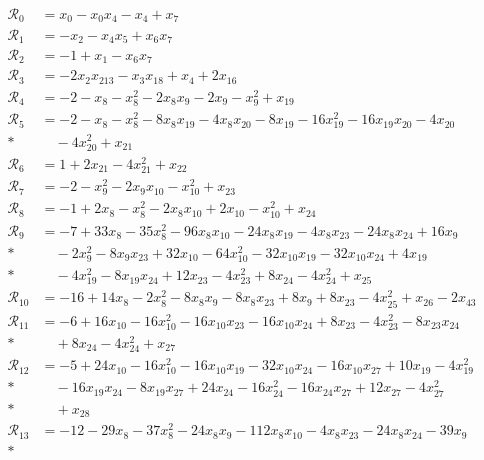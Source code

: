 \begingroup
\fontsize{8.6}{10.4}\selectfont
\setlength{\jot}{3pt}
\allowdisplaybreaks[4]
\begin{align*}
\mathcal R_{0} &= x_{0} -x_{0}x_{4} -x_{4} +x_{7} \\
\mathcal R_{1} &= -x_{2} -x_{4}x_{5} +x_{6}x_{7} \\
\mathcal R_{2} &= -1 +x_{1} -x_{6}x_{7} \\
\mathcal R_{3} &= -2x_{2}x_{213} -x_{3}x_{18} +x_{4} +2x_{16} \\
\mathcal R_{4} &= -2 -x_{8} -x_{8}^{2} -2x_{8}x_{9} -2x_{9} -x_{9}^{2} +x_{19} \\
\mathcal R_{5} &= -2 -x_{8} -x_{8}^{2} -8x_{8}x_{19} -4x_{8}x_{20} -8x_{19} -16x_{19}^{2} -16x_{19}x_{20} -4x_{20} \\*
&\quad -4x_{20}^{2} +x_{21} \\
\mathcal R_{6} &= 1 +2x_{21} -4x_{21}^{2} +x_{22} \\
\mathcal R_{7} &= -2 -x_{9}^{2} -2x_{9}x_{10} -x_{10}^{2} +x_{23} \\
\mathcal R_{8} &= -1 +2x_{8} -x_{8}^{2} -2x_{8}x_{10} +2x_{10} -x_{10}^{2} +x_{24} \\
\mathcal R_{9} &= -7 +33x_{8} -35x_{8}^{2} -96x_{8}x_{10} -24x_{8}x_{19} -4x_{8}x_{23} -24x_{8}x_{24} +16x_{9} \\*
&\quad -2x_{9}^{2} -8x_{9}x_{23} +32x_{10} -64x_{10}^{2} -32x_{10}x_{19} -32x_{10}x_{24} +4x_{19} \\*
&\quad -4x_{19}^{2} -8x_{19}x_{24} +12x_{23} -4x_{23}^{2} +8x_{24} -4x_{24}^{2} +x_{25} \\
\mathcal R_{10} &= -16 +14x_{8} -2x_{8}^{2} -8x_{8}x_{9} -8x_{8}x_{23} +8x_{9} +8x_{23} -4x_{25}^{2} +x_{26} -2x_{43} \\
\mathcal R_{11} &= -6 +16x_{10} -16x_{10}^{2} -16x_{10}x_{23} -16x_{10}x_{24} +8x_{23} -4x_{23}^{2} -8x_{23}x_{24} \\*
&\quad +8x_{24} -4x_{24}^{2} +x_{27} \\
\mathcal R_{12} &= -5 +24x_{10} -16x_{10}^{2} -16x_{10}x_{19} -32x_{10}x_{24} -16x_{10}x_{27} +10x_{19} -4x_{19}^{2} \\*
&\quad -16x_{19}x_{24} -8x_{19}x_{27} +24x_{24} -16x_{24}^{2} -16x_{24}x_{27} +12x_{27} -4x_{27}^{2} \\*
&\quad +x_{28} \\
\mathcal R_{13} &= -12 -29x_{8} -37x_{8}^{2} -24x_{8}x_{9} -112x_{8}x_{10} -4x_{8}x_{23} -24x_{8}x_{24} -39x_{9} \\*

\end{align*}
